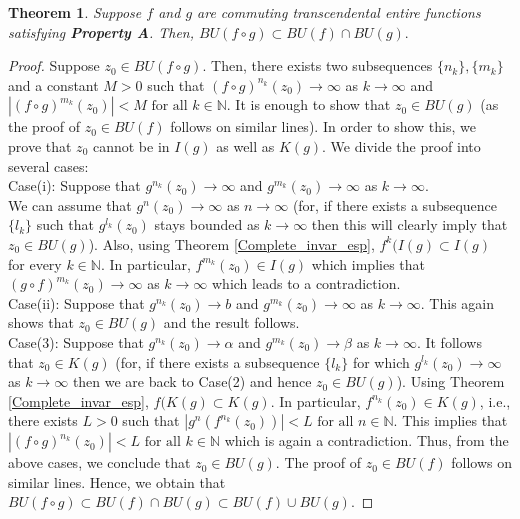\documentclass[10pt,a4paper]{amsart}
\newtheorem{theorem}{Theorem}
\begin{document}
\begin{theorem}
Suppose $f$ and $g$ are commuting transcendental entire functions  satisfying \textbf{Property A}. Then, $BU(f \circ g)\subset BU(f)\cap BU(g).$
\end{theorem}

\begin{proof}


 Suppose $z_0\in BU(f\circ g).$ Then,  there exists two subsequences $\{n_k\},\{m_k\}$ and a constant $M>0$ such that $(f\circ g)^{n_k}(z_0)\to\infty$ as $k\to\infty$ and $|(f\circ g)^{m_k}(z_0)|<M \mbox{ for all } k\in \mathbb{N}$. It is enough to show that $z_0\in BU(g)$ (as the proof of $z_0\in BU(f)$ follows on similar lines). In order to show  this, we prove that $z_0$ cannot be in $I(g)$ as well as $K(g).$ We divide the proof into several cases:\\
Case(i): Suppose that $g^{n_k}(z_0)\to\infty$ and $g^{m_k}(z_0)\to\infty$ as $k\to\infty$.\\
We can assume that $g^n(z_0)\to\infty$ as $n\to\infty$
(for, if there exists a subsequence $\{l_k\}$ such 
that $g^{l_k}(z_0)$ stays bounded as $k\to\infty$ then 
this will clearly imply that $z_0\in BU(g)$). Also, using Theorem \ref{Complete_invar_esp}, $f^k(I(g)\subset I(g)$ for every  $k\in\mathbb{N}$. In particular, $f^{m_k}(z_0)\in I(g)$ which implies that $(g\circ f)^{m_k}(z_0)\to\infty $ as $k\to\infty$ which leads to a  contradiction. \\
Case(ii): Suppose that $g^{n_k}(z_0)\to b$ and $g^{m_k}(z_0)\to\infty$ as $k\to\infty$. This again shows that $z_0\in BU(g)$ and the result follows.\\
Case(3): Suppose that $g^{n_k}(z_0)\to \alpha $ and $g^{m_k}(z_0)\to \beta$ as $k\to\infty.$   It follows that $z_0\in K(g)$ (for,  if there exists a subsequence $\{l_k\}$ for 
which $g^{l_k}(z_0)\to\infty$ as $k\to\infty$ then we are back to Case(2) 
 and hence $z_0\in BU(g)$). Using Theorem \ref{Complete_invar_esp},  $f(K(g)\subset K(g)$. In particular, $f^{n_k}(z_0)\in K(g)$, i.e., there exists $L>0$ such that $|g^n(f^{n_k}(z_0))|<L \mbox{ for all } n\in\mathbb{N}$. This implies that $|(f\circ g)^{n_k}(z_0)|<L \mbox{ for all } k\in\mathbb{N}$ which is again a contradiction. Thus, from the above cases, we conclude that $z_0\in BU(g).$  The proof of $z_0\in BU(f)$ follows on similar lines. 
Hence, we obtain that $BU(f\circ g)\subset BU(f)\cap BU(g)\subset BU(f)\cup BU(g)$.
\end{proof}
\end{document}
